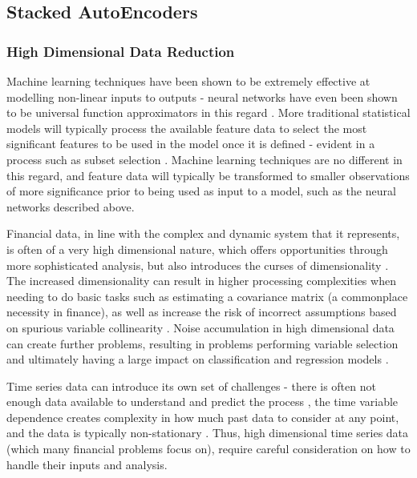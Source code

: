 \documentclass[a4paper,11pt,oneside]{article}
\theoremstyle{plain}
\theoremstyle{definition}
\begin{document}
	
	\subsection{Stacked AutoEncoders}\label{lr_SAE}
	
	\subsubsection{High Dimensional Data Reduction}\label{HDDR}
	
	Machine learning techniques have been shown to be extremely effective at modelling non-linear inputs 
	to outputs - neural networks have even been shown to be universal function approximators in this regard \citep{Hornik}. 
	More traditional statistical models will typically process the available feature data to select the most significant 
	features to be used in the model once it is defined - evident in a process such as subset selection \citep{Schaefer}. 
	Machine learning techniques are no different in this regard, and feature data will typically be transformed to smaller 
	observations of more significance prior to being used as input to a model, such as the neural networks described above.
	\hfill \break 
	
	Financial data, in line with the complex and dynamic system that it represents, is often of a very high dimensional 
	nature, which offers opportunities through more sophisticated analysis, but also introduces the curses of
	dimensionality \citep{Donoho}. The increased dimensionality can result in higher processing complexities when needing to 
	do basic tasks such as estimating a covariance matrix (a commonplace necessity in finance), as well as increase 
	the risk of incorrect assumptions based on spurious variable collinearity \citep{Fan1}. Noise accumulation in high 
	dimensional data can create further problems, resulting in problems performing variable selection and ultimately 
	having a large impact on classification and regression models \citep{Fan2}.
	\hfill \break 
	
	Time series data can introduce its own set of challenges - there is often not enough data available to understand 
	and predict the process \citep{Fama}, the time variable dependence creates complexity in how much past 
	data to consider at any point, and the data is typically non-stationary \citep{Langkvist}. Thus, high dimensional time 
	series data (which many financial problems focus on), require careful consideration on how to handle their inputs 
	and analysis.
	\hfill \break 
	
\end{document}
